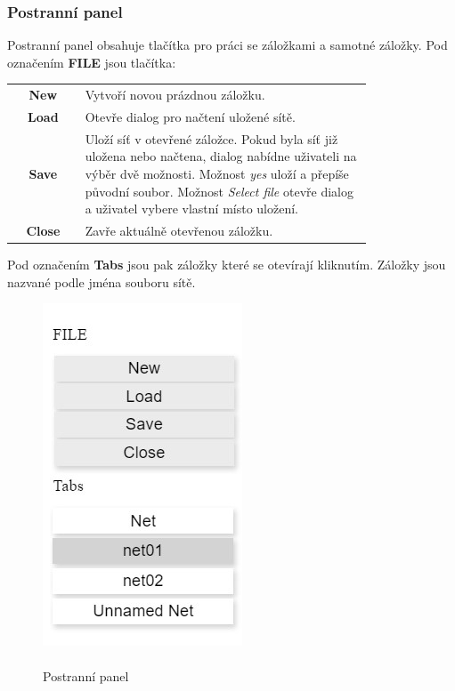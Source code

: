 \documentclass[
  biblatex,
  glossaries,
]{kidiplom}
\begin{document}
\subsubsection{Postranní panel}\label{panel}

Postranní panel obsahuje tlačítka pro práci se záložkami a 
samotné záložky. Pod označením \textbf{FILE} jsou tlačítka:
\begin{center}
  \begin{tabular}{c p{0.8\linewidth}}
    \textbf{New}    & Vytvoří novou prázdnou záložku. \\
    \textbf{Load}   & Otevře dialog pro načtení uložené sítě. \\
    \textbf{Save}   & Uloží síť v otevřené záložce. Pokud byla síť již uložena 
      nebo načtena, dialog nabídne uživateli na výběr dvě možnosti.
      Možnost \textit{yes} uloží a přepíše původní soubor.
      Možnost \textit{Select file} otevře dialog 
      a uživatel vybere vlastní místo uložení. \\
    \textbf{Close}  & Zavře aktuálně otevřenou záložku. \\
  \end{tabular}
\end{center}

Pod označením \textbf{Tabs} jsou pak záložky které se otevírají kliknutím.
Záložky jsou nazvané podle jména souboru sítě.

\begin{figure}[h]
  \centering
  \includegraphics{editor_panel}
  \caption{\\Postranní panel}\label{fig:Postranní panel}
\end{figure}
\end{document}
